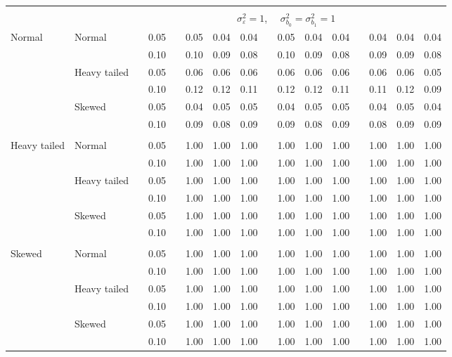\begin{table}[ht]
\begin{scriptsize}
\begin{center}
\begin{tabular}{ll p{.1cm} c p{.1cm} rrr p{.1cm} rrr p{.1cm} rrr}
&&&&&&&&&&&&&&&\\
& && && \multicolumn{9}{c}{$\sigma_{\varepsilon}^2 = 1$, \ \ $\sigma_{b_0}^2 = \sigma_{b_1}^2 = 1$} \\ \cline{6-16}

\rowcolor{gray!20}Normal       & Normal       && 0.05 &&  0.05 & 0.04 & 0.04 && 0.05 & 0.04 & 0.04 && 0.04 & 0.04 & 0.04 \\ 
\rowcolor{gray!20}             &              && 0.10 &&  0.10 & 0.09 & 0.08 && 0.10 & 0.09 & 0.08 && 0.09 & 0.09 & 0.08 \\ 
\rowcolor{gray!20}             & Heavy tailed && 0.05 &&  0.06 & 0.06 & 0.06 && 0.06 & 0.06 & 0.06 && 0.06 & 0.06 & 0.05 \\ 
\rowcolor{gray!20}             &              && 0.10 &&  0.12 & 0.12 & 0.11 && 0.12 & 0.12 & 0.11 && 0.11 & 0.12 & 0.09 \\ 
\rowcolor{gray!20}             & Skewed       && 0.05 &&  0.04 & 0.05 & 0.05 && 0.04 & 0.05 & 0.05 && 0.04 & 0.05 & 0.04 \\ 
\rowcolor{gray!20}             &              && 0.10 &&  0.09 & 0.08 & 0.09 && 0.09 & 0.08 & 0.09 && 0.08 & 0.09 & 0.09 \\ 
             &&&&&&&&&&&&&&&\\
Heavy tailed & Normal       && 0.05 &&  1.00 & 1.00 & 1.00 && 1.00 & 1.00 & 1.00 && 1.00 & 1.00 & 1.00 \\ 
             &              && 0.10 &&  1.00 & 1.00 & 1.00 && 1.00 & 1.00 & 1.00 && 1.00 & 1.00 & 1.00 \\ 
             & Heavy tailed && 0.05 &&  1.00 & 1.00 & 1.00 && 1.00 & 1.00 & 1.00 && 1.00 & 1.00 & 1.00 \\ 
             &              && 0.10 &&  1.00 & 1.00 & 1.00 && 1.00 & 1.00 & 1.00 && 1.00 & 1.00 & 1.00 \\ 
             & Skewed       && 0.05 &&  1.00 & 1.00 & 1.00 && 1.00 & 1.00 & 1.00 && 1.00 & 1.00 & 1.00 \\ 
             &              && 0.10 &&  1.00 & 1.00 & 1.00 && 1.00 & 1.00 & 1.00 && 1.00 & 1.00 & 1.00 \\
             &&&&&&&&&&&&&&&\\ 
Skewed       & Normal       && 0.05 &&  1.00 & 1.00 & 1.00 && 1.00 & 1.00 & 1.00 && 1.00 & 1.00 & 1.00 \\ 
             &              && 0.10 &&  1.00 & 1.00 & 1.00 && 1.00 & 1.00 & 1.00 && 1.00 & 1.00 & 1.00 \\ 
             & Heavy tailed && 0.05 &&  1.00 & 1.00 & 1.00 && 1.00 & 1.00 & 1.00 && 1.00 & 1.00 & 1.00 \\ 
             &              && 0.10 &&  1.00 & 1.00 & 1.00 && 1.00 & 1.00 & 1.00 && 1.00 & 1.00 & 1.00 \\ 
             & Skewed       && 0.05 &&  1.00 & 1.00 & 1.00 && 1.00 & 1.00 & 1.00 && 1.00 & 1.00 & 1.00 \\ 
             &              && 0.10 &&  1.00 & 1.00 & 1.00 && 1.00 & 1.00 & 1.00 && 1.00 & 1.00 & 1.00 \\ 



\end{tabular}
\end{center}
\end{scriptsize}
\end{table}
